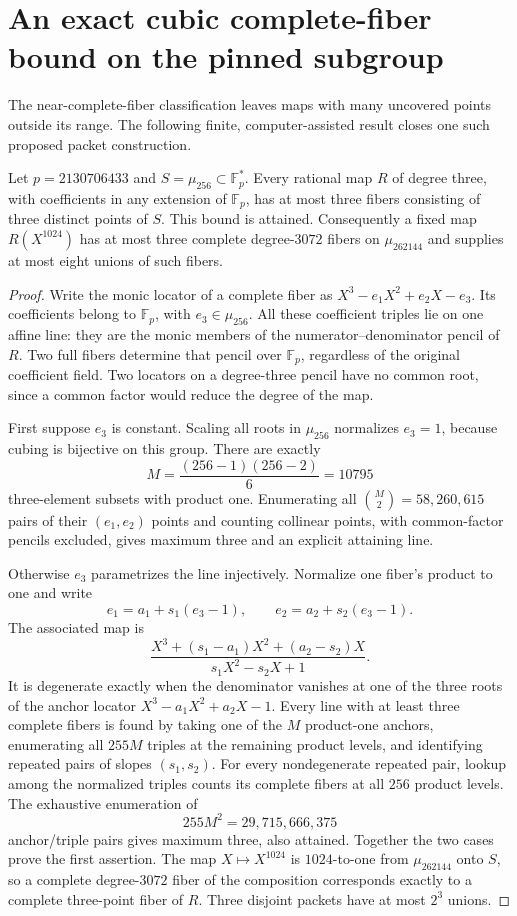 \section{An exact cubic complete-fiber bound on the pinned subgroup}
\label{app:general-cubic-packets}

The near-complete-fiber classification leaves maps with many uncovered
points outside its range. The following finite, computer-assisted result
closes one such proposed packet construction.

\begin{theorem}
\label{thm:exact-cubic-fibers}
Let $p=2130706433$ and $S=\mu_{256}\subset\mathbb F_p^*$.
Every rational map $R$ of degree three, with coefficients in any
extension of $\mathbb F_p$, has at most three fibers consisting of
three distinct points of $S$. This bound is attained.
Consequently a fixed map $R(X^{1024})$ has at most three complete
degree-$3072$ fibers on $\mu_{262144}$ and supplies at most eight
unions of such fibers.
\end{theorem}
\begin{proof}
Write the monic locator of a complete fiber as
$X^3-e_1X^2+e_2X-e_3$. Its coefficients belong to $\mathbb F_p$,
with $e_3\in\mu_{256}$. All these coefficient triples lie on one
affine line: they are the monic members of the numerator--denominator
pencil of $R$. Two full fibers determine that pencil over $\mathbb F_p$,
regardless of the original coefficient field. Two locators on a
degree-three pencil have no common root, since a common factor would
reduce the degree of the map.

First suppose $e_3$ is constant. Scaling all roots in $\mu_{256}$
normalizes $e_3=1$, because cubing is bijective on this group.
There are exactly
\[
 M=\frac{(256-1)(256-2)}6=10795
\]
three-element subsets with product one. Enumerating all
$\binom M2=58{,}260{,}615$ pairs of their $(e_1,e_2)$ points and
counting collinear points, with common-factor pencils excluded,
gives maximum three and an explicit attaining line.

Otherwise $e_3$ parametrizes the line injectively. Normalize one
fiber's product to one and write
\[
 e_1=a_1+s_1(e_3-1),\qquad e_2=a_2+s_2(e_3-1).
\]
The associated map is
\[
 \frac{X^3+(s_1-a_1)X^2+(a_2-s_2)X}
      {s_1X^2-s_2X+1}.
\]
It is degenerate exactly when the denominator vanishes at one of
the three roots of the anchor locator
$X^3-a_1X^2+a_2X-1$. Every line with at least three complete fibers
is found by taking one of the $M$ product-one anchors, enumerating
all $255M$ triples at the remaining product levels, and identifying
repeated pairs of slopes $(s_1,s_2)$. For every nondegenerate repeated
pair, lookup among the normalized triples counts its complete fibers
at all $256$ product levels. The exhaustive enumeration of
\[
 255M^2=29{,}715{,}666{,}375
\]
anchor/triple pairs gives maximum three, also attained.
Together the two cases prove the first assertion. The map
$X\mapsto X^{1024}$ is $1024$-to-one from $\mu_{262144}$ onto $S$,
so a complete degree-$3072$ fiber of the composition corresponds
exactly to a complete three-point fiber of $R$. Three disjoint
packets have at most $2^3$ unions.
\end{proof}

